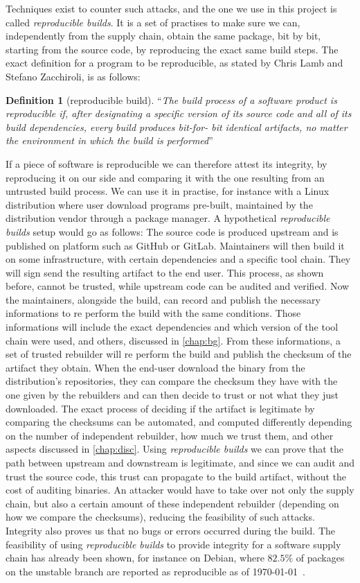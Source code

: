 \documentclass[a4paper,11pt,oneside]{report}
\theoremstyle{definition}
\newtheorem{definition}{Definition}[section]
\newcommand{\rb}{\emph{reproducible builds}\xspace}
\begin{document}
Techniques exist to counter such attacks, and the one we use in this project is
called \rb. It is a set of practises to make sure we can, independently from
the supply chain, obtain the same package, bit by bit, starting from the source
code, by reproducing the exact same build steps. The exact definition for a
program to be reproducible, as stated by Chris Lamb and Stefano Zacchiroli, is
as follows:

\begin{definition}[reproducible build]
``\emph{The build process of a software
product is reproducible if, after designating a
specific version of its source code and all of its
build dependencies, every build produces bit-for-
bit identical artifacts, no matter the environment
in which the build is performed}''~\cite{DBLP:journals/corr/abs-2104-06020}
\end{definition}

If a piece of software is reproducible we can therefore attest its integrity,
by reproducing it on our side and comparing it with the one resulting from an
untrusted build process. We can use it in practise, for instance with a Linux
distribution where user download programs pre-built, maintained by the
distribution vendor through a package manager. A hypothetical \rb setup would
go as follows: The source code is produced upstream and is published on
platform such as GitHub or GitLab. Maintainers will then build it on some
infrastructure, with certain dependencies and a specific tool chain. They will
sign send the resulting artifact to the end user. This process, as shown
before, cannot be trusted, while upstream code can be audited and verified. Now
the maintainers, alongside the build, can record and publish the necessary
informations to re perform the build with the same conditions. Those
informations will include the exact dependencies and which version of the
tool chain were used, and others, discussed in \autoref{chap:bg}.
From these informations, a set of trusted rebuilder will re perform the build
and publish the checksum of the artifact they obtain. When the end-user
download the binary from the distribution's repositories, they can compare the
checksum they have with the one given by the rebuilders and can then decide to
trust or not what they just downloaded. The exact process of deciding if the
artifact is legitimate by comparing the checksums can be automated, and
computed differently depending on the number of independent rebuilder, how much
we trust them, and other aspects discussed in \autoref{chap:disc}.
Using \rb we can prove that the path between upstream and downstream is
legitimate, and since we can audit and trust the source code, this trust can
propagate to the build artifact, without the cost of auditing binaries. An
attacker would have to take over not only the supply chain, but also a certain
amount of these independent rebuilder (depending on how we compare the
checksums), reducing the feasibility of such attacks. Integrity also proves us
that no bugs or errors occurred during the build.
The feasibility of using \rb to provide integrity for a software supply chain
has already been shown, for instance on Debian, where $82.5\%$ of packages on the
unstable branch are reported as reproducible as of \today~\cite{debian:repro}.
\end{document}
